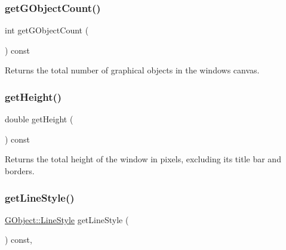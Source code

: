 \subsubsection{\texorpdfstring{get\+G\+Object\+Count()}{getGObjectCount()}}
{\footnotesize\ttfamily int get\+G\+Object\+Count (\begin{DoxyParamCaption}{ }\end{DoxyParamCaption}) const\hspace{0.3cm}{\ttfamily [virtual]}}



Returns the total number of graphical objects in the window\textquotesingle{}s canvas. 

\mbox{\label{classsgl_1_1GWindow_a1e7e353362434072875264cf95629f99}} 
\subsubsection{\texorpdfstring{get\+Height()}{getHeight()}}
{\footnotesize\ttfamily double get\+Height (\begin{DoxyParamCaption}{ }\end{DoxyParamCaption}) const\hspace{0.3cm}{\ttfamily [virtual]}}



Returns the total height of the window in pixels, excluding its title bar and borders. 

\mbox{\label{classsgl_1_1GDrawingSurface_aaf1f5ea8281e5e3486662878d26f0a13}} 
\subsubsection{\texorpdfstring{get\+Line\+Style()}{getLineStyle()}}
{\footnotesize\ttfamily \mbox{\hyperlink{classsgl_1_1GObject_a86e0f5648542856159bb40775c854aa7}{G\+Object\+::\+Line\+Style}} get\+Line\+Style (\begin{DoxyParamCaption}{ }\end{DoxyParamCaption}) const\hspace{0.3cm}{\ttfamily [virtual]}, {\ttfamily [inherited]}}



